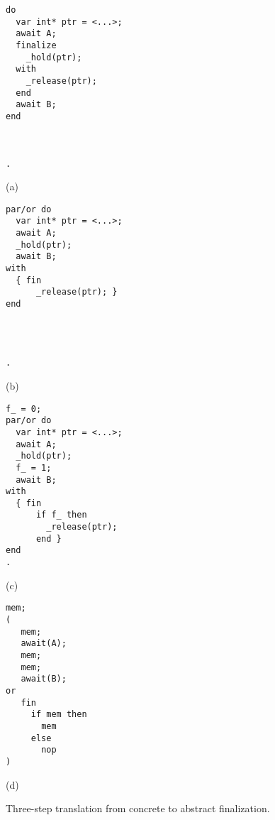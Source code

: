 \begin{figure}
\begin{minipage}[t]{0.26\linewidth}
\begin{lstlisting}
do
  var int* ptr = <...>;
  await A;
  finalize
    _hold(ptr);
  with
    _release(ptr);
  end
  await B;
end



.
\end{lstlisting}
\centering\small{(a)}
\end{minipage}
%
\begin{minipage}[t]{0.26\linewidth}
\begin{lstlisting}
par/or do
  var int* ptr = <...>;
  await A;
  _hold(ptr);
  await B;
with
  { fin
      _release(ptr); }
end




.
\end{lstlisting}
\centering\small{(b)}
\end{minipage}
%
\begin{minipage}[t]{0.26\linewidth}
\begin{lstlisting}
f_ = 0;
par/or do
  var int* ptr = <...>;
  await A;
  _hold(ptr);
  f_ = 1;
  await B;
with
  { fin
      if f_ then
        _release(ptr);
      end }
end
.
\end{lstlisting}
\centering\small{(c)}
\end{minipage}
%
\begin{minipage}[t]{0.18\linewidth}
\begin{lstlisting}
mem;
(
   mem;
   await(A);
   mem;
   mem;
   await(B);
or
   fin
     if mem then
       mem
     else
       nop
)
\end{lstlisting}
\centering\small{(d)}
\end{minipage}
%
\caption{
Three-step translation from concrete to abstract finalization.
\label{lst.map.fin}
}
\end{figure}
